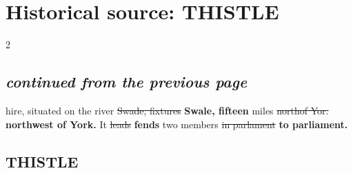 \documentclass[10pt]{article}
\begin{document}
\section*{Historical source: THISTLE}
\begin{multicols}{2}
\subsection*{\textit{continued from the previous page}}
hire, situated on the river \sout{Swade, fixtures} \textbf{Swale, fifteen} miles \sout{northof Yor.} \textbf{northwest of York.} It \sout{leads} \textbf{fends} two members \sout{in parlament} \textbf{to parliament.}

\subsection*{THISTLE}

\end{multicols}
\end{document}
